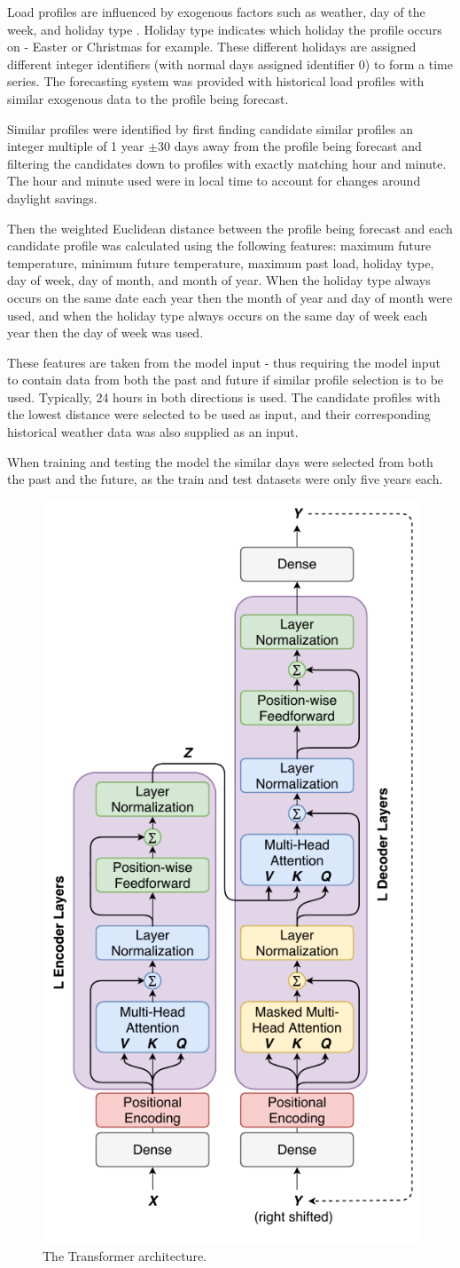 \documentclass[conference]{IEEEtran}
\begin{document}
Load profiles are influenced by exogenous factors such as weather, day of the week, and holiday type \cite{Weron2006}.
Holiday type indicates which holiday the profile occurs on - Easter or Christmas for example.
These different holidays are assigned different integer identifiers (with normal days assigned identifier 0) to form a time series.
The forecasting system was provided with historical load profiles with similar exogenous data to the profile being forecast.
\par
Similar profiles were identified by first finding candidate similar profiles an integer multiple of 1 year $\pm$30 days away from the profile being forecast and filtering the candidates down to profiles with exactly matching hour and minute.
The hour and minute used were in local time to account for changes around daylight savings.

Then the weighted Euclidean distance between the profile being forecast and each candidate profile was calculated using the following features: 
maximum future temperature, 
minimum future temperature,
maximum past load,
holiday type, 
day of week,
day of month, and
month of year.
When the holiday type always occurs on the same date each year then the month of year and day of month were used, and when the holiday type always occurs on the same day of week each year then the day of week was used.

These features are taken from the model input - thus requiring the model input to contain data from both the past and future if similar profile selection is to be used.
Typically, 24 hours in both directions is used.
The candidate profiles with the lowest distance were selected to be used as input, and their corresponding historical weather data was also supplied as an input.
\par
When training and testing the model the similar days were selected from both the past and the future, as the train and test datasets were only five years each.

\begin{figure}[htbp]
	\centerline{\includegraphics[width=.35\textwidth]{images/transformer.pdf}}
	\caption{The Transformer architecture.}
	\label{fig:transformer}
\end{figure}
\end{document}
